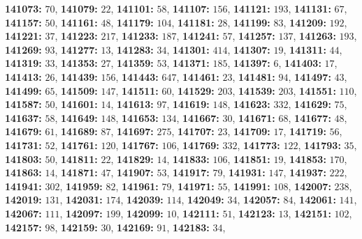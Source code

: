 \textsf{\bfseries 141073:} $70$, \textsf{\bfseries 141079:} $22$, \textsf{\bfseries 141101:} $58$, \textsf{\bfseries 141107:} $156$, \textsf{\bfseries 141121:} $193$, \textsf{\bfseries 141131:} $67$, \textsf{\bfseries 141157:} $50$, \textsf{\bfseries 141161:} $48$, \textsf{\bfseries 141179:} $104$, \textsf{\bfseries 141181:} $28$, \textsf{\bfseries 141199:} $83$, \textsf{\bfseries 141209:} $192$, \textsf{\bfseries 141221:} $37$, \textsf{\bfseries 141223:} $217$, \textsf{\bfseries 141233:} $187$, \textsf{\bfseries 141241:} $57$, \textsf{\bfseries 141257:} $137$, \textsf{\bfseries 141263:} $193$, \textsf{\bfseries 141269:} $93$, \textsf{\bfseries 141277:} $13$, \textsf{\bfseries 141283:} $34$, \textsf{\bfseries 141301:} $414$, \textsf{\bfseries 141307:} $19$, \textsf{\bfseries 141311:} $44$, \textsf{\bfseries 141319:} $33$, \textsf{\bfseries 141353:} $27$, \textsf{\bfseries 141359:} $53$, \textsf{\bfseries 141371:} $185$, \textsf{\bfseries 141397:} $6$, \textsf{\bfseries 141403:} $17$, \textsf{\bfseries 141413:} $26$, \textsf{\bfseries 141439:} $156$, \textsf{\bfseries 141443:} $647$, \textsf{\bfseries 141461:} $23$, \textsf{\bfseries 141481:} $94$, \textsf{\bfseries 141497:} $43$, \textsf{\bfseries 141499:} $65$, \textsf{\bfseries 141509:} $147$, \textsf{\bfseries 141511:} $60$, \textsf{\bfseries 141529:} $203$, \textsf{\bfseries 141539:} $203$, \textsf{\bfseries 141551:} $110$, \textsf{\bfseries 141587:} $50$, \textsf{\bfseries 141601:} $14$, \textsf{\bfseries 141613:} $97$, \textsf{\bfseries 141619:} $148$, \textsf{\bfseries 141623:} $332$, \textsf{\bfseries 141629:} $75$, \textsf{\bfseries 141637:} $58$, \textsf{\bfseries 141649:} $148$, \textsf{\bfseries 141653:} $134$, \textsf{\bfseries 141667:} $30$, \textsf{\bfseries 141671:} $68$, \textsf{\bfseries 141677:} $48$, \textsf{\bfseries 141679:} $61$, \textsf{\bfseries 141689:} $87$, \textsf{\bfseries 141697:} $275$, \textsf{\bfseries 141707:} $23$, \textsf{\bfseries 141709:} $17$, \textsf{\bfseries 141719:} $56$, \textsf{\bfseries 141731:} $52$, \textsf{\bfseries 141761:} $120$, \textsf{\bfseries 141767:} $106$, \textsf{\bfseries 141769:} $332$, \textsf{\bfseries 141773:} $122$, \textsf{\bfseries 141793:} $35$, \textsf{\bfseries 141803:} $50$, \textsf{\bfseries 141811:} $22$, \textsf{\bfseries 141829:} $14$, \textsf{\bfseries 141833:} $106$, \textsf{\bfseries 141851:} $19$, \textsf{\bfseries 141853:} $170$, \textsf{\bfseries 141863:} $14$, \textsf{\bfseries 141871:} $47$, \textsf{\bfseries 141907:} $53$, \textsf{\bfseries 141917:} $79$, \textsf{\bfseries 141931:} $147$, \textsf{\bfseries 141937:} $222$, \textsf{\bfseries 141941:} $302$, \textsf{\bfseries 141959:} $82$, \textsf{\bfseries 141961:} $79$, \textsf{\bfseries 141971:} $55$, \textsf{\bfseries 141991:} $108$, \textsf{\bfseries 142007:} $238$, \textsf{\bfseries 142019:} $131$, \textsf{\bfseries 142031:} $174$, \textsf{\bfseries 142039:} $114$, \textsf{\bfseries 142049:} $34$, \textsf{\bfseries 142057:} $84$, \textsf{\bfseries 142061:} $141$, \textsf{\bfseries 142067:} $111$, \textsf{\bfseries 142097:} $199$, \textsf{\bfseries 142099:} $10$, \textsf{\bfseries 142111:} $51$, \textsf{\bfseries 142123:} $13$, \textsf{\bfseries 142151:} $102$, \textsf{\bfseries 142157:} $98$, \textsf{\bfseries 142159:} $30$, \textsf{\bfseries 142169:} $91$, \textsf{\bfseries 142183:} $34$, 
